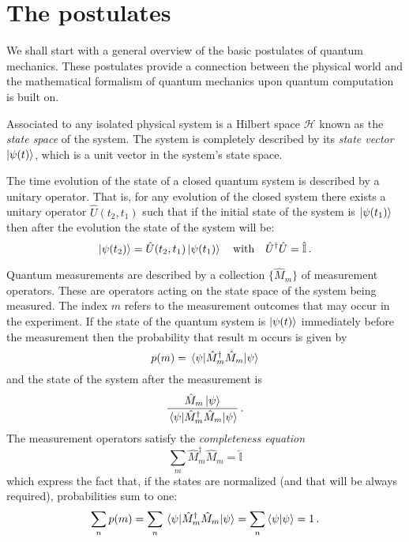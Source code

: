 \section{The postulates}
We shall start with a general overview of the basic postulates of quantum mechanics. These postulates provide a connection between the physical world and the mathematical formalism of quantum mechanics upon quantum computation is built on.
\begin{postulate}\label{postulate:1}
Associated to any isolated physical system is a Hilbert space $\mathcal{H}$ known as the \emph{state space} of the
system. The system is completely described by its \emph{state vector} $\ket{\psi(t)}$, which is a unit
vector in the system’s state space.
\end{postulate}
\begin{postulate}\label{postulate:2}
The time evolution of the state of a closed quantum system is described by a
unitary operator. That is, for any evolution of the closed system there exists
a unitary operator $\widehat{U}(t_2,t_1)$ such that if the initial state of the system is $\ket{\psi(t_1)}$ then
after the evolution the state of the system will be:
\begin{equation*}
    \ket{\psi(t_2)} = \hat{U}(t_2,t_1) \ket{\psi(t_1)} \quad \text{with} \quad \hat{U}^\dagger\hat{U} = \hat{\mathbb{I}}\,.
\end{equation*}
\end{postulate}
\begin{postulate}\label{postulate:3}
Quantum measurements are described by a collection $\{\hat{M}_m\}$ of
measurement operators. These are operators acting on the state space of the
system being measured. The index $m$ refers to the measurement outcomes that
may occur in the experiment. If the state of the quantum system is $\ket{\psi(t)}$
immediately before the measurement then the probability that result m occurs is given by
\begin{equation*}
    p(m) = \expval{\hat{M}^\dagger_m \hat{M}_m}{\psi}
\end{equation*}
and the state of the system after the measurement is
\begin{equation*}
    \frac{\hat{M}_m\ket{\psi}}{\expval{\hat{M}^\dagger_m \hat{M}_m}{\psi}}\,.
\end{equation*}
The measurement operators satisfy the \emph{completeness equation}
\begin{equation*}
    \sum_m \hat{M}_m^\dagger \hat{M}_m = \hat{\mathbb{I}}
\end{equation*}
which express the fact that, if the states are normalized (and that will be always required), probabilities sum to one: 
    \begin{equation}\label{eq:normalization}
    \sum_n p(m) = \sum_n \expval{\hat{M}^\dagger_m \hat{M}_m}{\psi} = \sum_n \braket{\psi} = 1\,.
    \end{equation}
\end{postulate}
